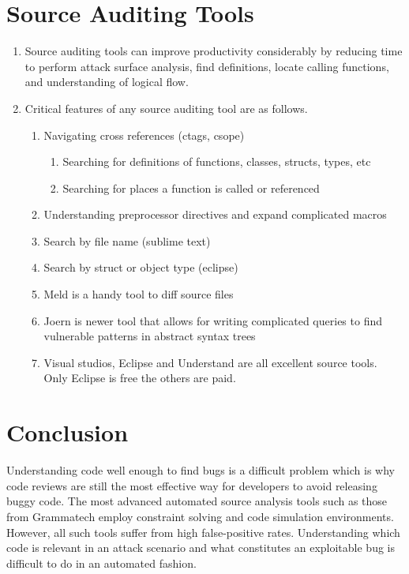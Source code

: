 \documentclass[12pt]{Training}
\begin{document}
\section*{Source Auditing Tools}
\begin{enumerate}
	\item Source auditing tools can improve productivity considerably by reducing time to perform attack surface analysis, find definitions, locate calling functions, and understanding of logical flow.
	\item Critical features of any source auditing tool are as follows.
		\begin{enumerate}	
			\item Navigating cross references (ctags, csope)
				\begin{enumerate}
					\item Searching for definitions of functions, classes, structs, types, etc
					\item Searching for places a function is called or referenced
				\end{enumerate}
			\item Understanding preprocessor directives and expand complicated macros
			\item Search by file name (sublime text)
			\item Search by struct or object type (eclipse)
			\item Meld is a handy tool to diff source files
			\item Joern is newer tool that allows for writing complicated queries to find vulnerable patterns in abstract syntax trees
			\item Visual studios, Eclipse and Understand are all excellent source tools. Only Eclipse is free the others are paid.
		\end{enumerate}	
\end{enumerate}


\section*{Conclusion}
Understanding code well enough to find bugs is a difficult problem which is why code reviews are still the most effective way for developers to avoid releasing buggy code. The most advanced automated source analysis tools such as those from Grammatech employ constraint solving and code simulation environments. However, all such tools suffer from high false-positive rates. Understanding which code is relevant in an attack scenario and what constitutes an exploitable bug is difficult to do in an automated fashion.
\end{document}
